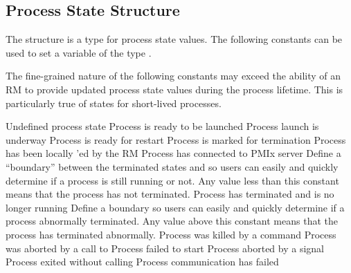 \subsection{Process State Structure}
\label{api:struct:processstate}

The  structure is a  type for process state values. The following constants can be used to set a variable of the type .

\adviceuserstart
The fine-grained nature of the following constants may exceed the ability of an \ac{RM} to provide updated process state values during the process lifetime. This is particularly true of states for short-lived processes.
\adviceuserend

\begin{constantdesc}
%
Undefined process state
%
Process is ready to be launched
%
Process launch is underway
%
Process is ready for restart
%
Process is marked for termination
%
Process has been locally 'ed by the \ac{RM}
%
Process has connected to PMIx server
%
Define a ``boundary'' between the terminated states and  so users can easily and quickly determine if a process is still running or not.
Any value less than this constant means that the process has not terminated.
%
Process has terminated and is no longer running
%
Define a boundary so users can easily and quickly determine if a process abnormally terminated.
Any value above this constant means that the process has terminated abnormally.
%
Process was killed by a command
%
Process was aborted by a call to 
%
Process failed to start
%
Process aborted by a signal
%
Process exited without calling 
%
Process communication has failed

\end{constantdesc}
